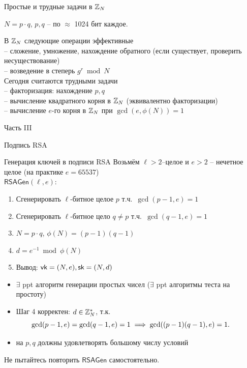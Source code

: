 \documentclass[usenames,dvipsnames,8pt,aspectratio=169]{beamer}
\begin{document}
\begin{frame}{Простые и трудные задачи в ${{\mathbb Z}}_N$}
\Large 
\begin{center}
{\color{Orange}  $N = p \cdot q$},  $p, q$ -- по $\approx$ 1024 бит каждое.\\
\end{center}
В ${{\mathbb Z}}_N$ следующие операции  {\color{Orange} эффективные}  \\[5pt]
-- сложение, умножение, нахождение обратного (если существует, проверить несуществование)\\[3pt]
--  возведение в степерь $g^r \bmod N$ \\[14pt]
Сегодня  {\color{Orange} считаются трудными} задачи \\[5pt]
-- {\color{Orange} факторизация}: нахождение $p, q$  \\[3pt]
-- вычисление квадратного корня в ${{\mathbb Z}}_N$ (эквивалентно факторизации) \\[3pt]
-- вычисление $e$-го корня в  ${{\mathbb Z}}_N$ при $\gcd(e, \phi(N)) = 1$\\
\end{frame}


\begin{frame}
Часть III \\ [10pt]
\begin{LARGE}
	
	\color{Orange}
	\Huge  Подпись RSA
	
\end{LARGE}
\end{frame}



\begin{frame}{Генерация ключей в подписи RSA}
\Large
Возьмём $\ell>2$--целое и $e>2$ -- нечетное целое (на практике  $e=65537$) \\[8pt]
{\color{Orange} $\mathsf{RSAGen}(\ell, e):$}
\begin{enumerate}
	\itemsep5pt
	\item Сгенерировать $\ell$-битное целое $p$ т.ч.\ $\gcd(p-1, e)=1$
	\item Сгенерировать  $\ell$-битное цело $q \neq p$ т.ч.\ $\gcd(q-1, e)=1$
	\item $N= p \cdot q$, $\phi(N) = (p-1)(q-1)$
	\item $d = e^{-1} \bmod \phi(N)$
	\item Вывод: $\textsf{vk} = (N, e), \textsf{sk}=(N, d)$
\end{enumerate}
\large
\pause
\begin{itemize}
	\item  $\exists$ ppt алгоритм генерации простых чисел ($\exists$  ppt алгоритмы теста на простоту)
	\item Шаг 4 корректен:  $d \in {{\mathbb Z}}_N^\ast$, т.к. \[ \hspace{-20pt} \gcd(p-1, e) = \gcd(q-1, e) = 1 \implies \gcd((p-1)(q-1), e)=1.\]
	\item на $p,q$ должны удовлетворять  {\color{Orange} большому числу условий} 
\end{itemize}
\centering
\Large Не пытайтесь повторить $\mathsf{RSAGen}$ самостоятельно. 
\end{frame}
\end{document}
